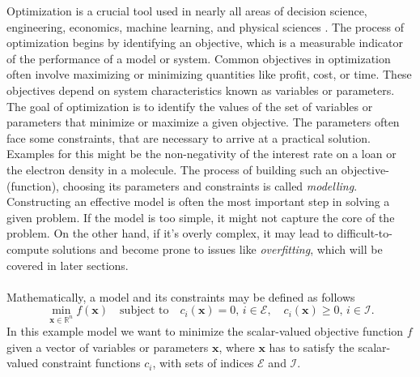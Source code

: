 Optimization is a crucial tool used in nearly all areas of decision science, engineering, economics, machine learning, and physical sciences \cite{nocedal2006numerical}.
The process of optimization begins by identifying an objective, which is a measurable indicator of the performance of a model or system. 
Common objectives in optimization often involve maximizing or minimizing quantities like profit, cost, or time.
These objectives depend on system characteristics known as variables or parameters.
The goal of optimization is to identify the values of the set of variables or parameters that minimize or maximize a given objective.
The parameters often face some constraints, that are necessary to arrive at a practical solution.
Examples for this might be the non-negativity of the interest rate on a loan or the electron
density in a molecule\cite{nocedal2006numerical}.
The process of building such an objective-(function), choosing its parameters and constraints is called \emph{modelling}.
Constructing an effective model is often the most important step in solving a given problem.
If the model is too simple, it might not capture the core of the problem.
On the other hand, if it's overly complex, it may lead to difficult-to-compute solutions and become prone to issues like \emph{overfitting},
which will be covered in later sections. \\\\
Mathematically, a model and its constraints may be defined as follows
\[
\min_{\mathbf{x} \in \mathbb{R}^{n}} f(\mathbf{x}) \quad \text{subject to} \quad
c_i(\mathbf{x}) = 0, \, i \in \mathcal{E}, \quad
c_i(\mathbf{x}) \geq 0, \, i \in \mathcal{I}.
\]
In this example model we want to minimize the scalar-valued objective function $f$ given a vector of variables or parameters $\mathbf{x}$,
where $\mathbf{x}$ has to satisfy the scalar-valued constraint functions $c_i$, with sets of indices $\mathcal{E}$ and $\mathcal{I}$.

